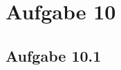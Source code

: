 \chapter{Aufgabe 10}
\section{Aufgabe 10.1}
\inputminted[linenos=true, breaklines, fontsize=\fontsize{10pt}{10pt}]{cpp}{../task10/main.cpp}